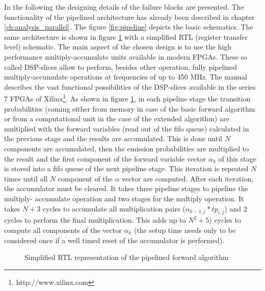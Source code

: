 \documentclass[mscthesis]{usiinfthesis}
\begin{document}
In the following the designing details of the failure blocks are presented.
The functionality of the pipelined architecture has already been described in
chapter \ref{ch:analysis_parallel}. The figure \ref{fig:pipeline} depicts the
basic schematics. The same architecture is shown in figure \ref{fig:arch_pipe}
with a simplified RTL (register transfer level) schematic. The main aspect of
the chosen design is to use the high performance multiply-accumulate units
available in modern FPGAs. These so called DSP-slices allow to perform, besides
other operation, fully pipelined multiply-accumulate operations at frequencies
of up to 450 MHz. The manual \cite{xilinx_DSP} describes the vast functional
possibilities of the DSP-slices available in the series 7 FPGAs of
Xilinx\footnote{http://www.xilinx.com}. As shown in figure \ref{fig:arch_pipe},
in each pipeline stage the transition probabilities (coming either from memory
in case of the basic forward algorithm or from a computational unit in the case
of the extended algorithm) are multiplied with the forward variables (read out
of the fifo queue) calculated in the previous stage and the results are
accumulated. This is done until $N$ components are accumulated, then the
emission probabilities are multiplied to the result and the first component of
the forward variable vector $\alpha_k$ of this stage is stored into a fifo
queue of the next pipeline stage. This iteration is repeated $N$ times until
all $N$ component of the $\alpha$ vector are computed. After each iteration, the
accumulator must be cleared. It takes three pipeline stages to pipeline the
multiply- accumulate operation and two stages for the multiply operation. It
takes $N+3$ cycles to accumulate all multiplication pairs ($\alpha_{k-1, j}
* tp_{i,j}$) and $2$ cycles to perform the final multiplication. This adds up
to $N^2+5)$ cycles to compute all components of the vector $\alpha_k$ (the
setup time needs only to be considered once if a well timed reset of the
accumulator is performed).

\begin{figure}
    \centering
    
    \caption{Simplified RTL representation of the pipelined forward algorithm}
    \label{fig:arch_pipe}
\end{figure}
\end{document}

